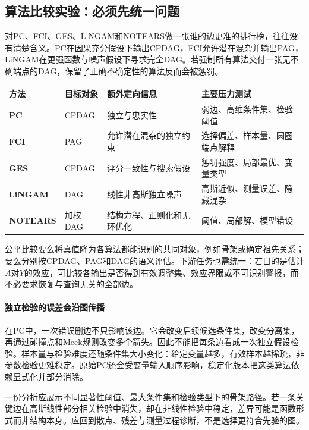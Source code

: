 \subsection{算法比较实验：必须先统一问题}

对PC、FCI、GES、LiNGAM和NOTEARS做一张谁的边更准的排行榜，往往没有清楚含义。PC在因果充分假设下输出CPDAG，FCI允许潜在混杂并输出PAG，LiNGAM在更强函数与噪声假设下寻求完全DAG。若强制所有算法交付一张无不确端点的DAG，保留了正确不确定性的算法反而会被惩罚。

\begin{center}
\small
\begin{tabularx}{\textwidth}{>{\bfseries}p{1.9cm}p{2.0cm}X X}
\toprule
方法 & 目标对象 & 额外定向信息 & 主要压力测试\\
\midrule
PC & CPDAG & 独立与忠实性 & 弱边、高维条件集、检验阈值\\
FCI & PAG & 允许潜在混杂的独立约束 & 选择偏差、样本量、圆圈端点解释\\
GES & CPDAG & 评分一致性与搜索假设 & 惩罚强度、局部最优、变量类型\\
LiNGAM & DAG & 线性非高斯独立噪声 & 高斯近似、测量误差、隐藏混杂\\
NOTEARS & 加权DAG & 结构方程、正则化和无环优化 & 阈值、局部解、模型错设\\
\bottomrule
\end{tabularx}
\end{center}

公平比较要么将真值降为各算法都能识别的共同对象，例如骨架或确定祖先关系；要么分别按CPDAG、PAG和DAG的语义评估。下游任务也需统一：若目的是估计$A$对$Y$的效应，可比较各输出是否得到有效调整集、效应界限或不可识别警报，而不必要求恢复与查询无关的全部边。

\paragraph{独立检验的误差会沿图传播}

在PC中，一次错误删边不只影响该边。它会改变后续候选条件集，改变分离集，再通过碰撞点和Meek规则改变多个箭头。因此不能把每条边看成一次独立假设检验。样本量与检验难度还随条件集大小变化：给定变量越多，有效样本越稀疏，非参数检验更难稳定。原始PC还会受变量输入顺序影响，稳定化版本把这类算法依赖显式化并部分消除\parencite{colombomaathuis2014}。

一份分析应展示不同显著性阈值、最大条件集和检验类型下的骨架路径。若一条关键边在高斯线性部分相关检验中消失，却在非线性检验中稳定，差异可能是函数形式而非结构本身。应回到散点、残差与测量过程诊断，不是选择更符合先验的图。

